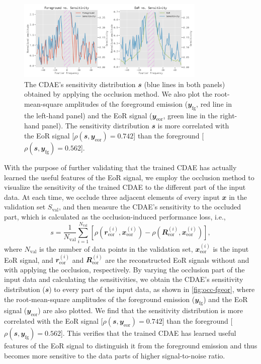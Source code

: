 \documentclass[fleqn,usenatbib]{mnras}
\newcommand{\R}[1]{\mathrm{#1}}
\newcommand{\B}[1]{\mathbfit{#1}}
\begin{document}
\begin{figure}
  \centering
  \includegraphics[width=0.8\textwidth]{occlusion-fgeor}
  \caption{\label{fig:occ-fgeor}%
    The CDAE's sensitivity distribution $\B{s}$ (blue lines in both
    panels) obtained by applying the occlusion method.
    We also plot the root-mean-square amplitudes of the foreground emission
    ($\B{y}_{\R{fg}}$, red line in the left-hand panel) and the EoR signal
    ($\B{y}_{\R{eor}}$, green line in the right-hand panel).
    The sensitivity distribution $\B{s}$ is more correlated with the EoR
    signal [$\rho(\B{s}, \B{y}_{\R{eor}}) = 0.742$] than the foreground
    [$\rho(\B{s}, \B{y}_{\R{fg}}) = 0.562$].
  }
\end{figure}

With the purpose of further validating that the trained CDAE has actually
learned the useful features of the EoR signal, we employ the occlusion
method \citep{zeiler2014} to visualize the sensitivity of the trained CDAE
to the different part of the input data.
At each time, we occlude three adjacent elements of every input
$\B{x}$ in the validation set $S_{\R{val}}$, and then measure the CDAE's
sensitivity to the occluded part, which is calculated as the
occlusion-induced performance loss, i.e.,
\begin{equation}
  \label{eq:perf-loss}
  s = \frac{1}{N_{\R{val}}} \sum_{i=1}^{N_{\R{val}}}
    \left[ \rho\left(\B{r}^{(i)}_{\R{eor}}, \B{x}^{(i)}_{\R{eor}}\right) -
      \rho\left(\B{R}^{(i)}_{\R{eor}}, \B{x}^{(i)}_{\R{eor}}\right) \right],
\end{equation}
where
$N_{\R{val}}$ is the number of data points in the validation set,
$\B{x}^{(i)}_{\R{eor}}$ is the input EoR signal, and
$\B{r}^{(i)}_{\R{eor}}$ and $\B{R}^{(i)}_{\R{eor}}$ are the reconstructed
EoR signals without and with applying the occlusion, respectively.
By varying the occlusion part of the input data and calculating the
sensitivities, we obtain the CDAE's sensitivity distribution ($\B{s}$) to
every part of the input data, as shown in \autoref{fig:occ-fgeor}, where
the root-mean-square amplitudes of the foreground emission
($\B{y}_{\R{fg}}$) and the EoR signal ($\B{y}_{\R{eor}}$) are also plotted.
We find that the sensitivity distribution is more correlated with the EoR
signal [$\rho(\B{s}, \B{y}_{\R{eor}}) = 0.742$] than the foreground
[$\rho(\B{s}, \B{y}_{\R{fg}}) = 0.562$].
This verifies that the trained CDAE has learned useful features of the EoR
signal to distinguish it from the foreground emission and thus becomes more
sensitive to the data parts of higher signal-to-noise ratio.
\end{document}
